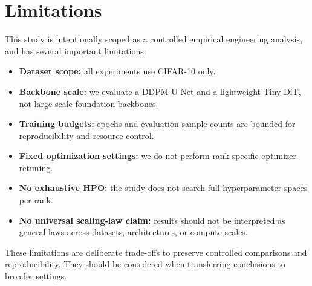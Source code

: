 \section{Limitations}

This study is intentionally scoped as a controlled empirical engineering analysis, and has several important limitations:
\begin{itemize}[leftmargin=1.5em]
  \item \textbf{Dataset scope:} all experiments use CIFAR-10 only.
  \item \textbf{Backbone scale:} we evaluate a DDPM U-Net and a lightweight Tiny DiT, not large-scale foundation backbones.
  \item \textbf{Training budgets:} epochs and evaluation sample counts are bounded for reproducibility and resource control.
  \item \textbf{Fixed optimization settings:} we do not perform rank-specific optimizer retuning.
  \item \textbf{No exhaustive HPO:} the study does not search full hyperparameter spaces per rank.
  \item \textbf{No universal scaling-law claim:} results should not be interpreted as general laws across datasets, architectures, or compute scales.
\end{itemize}

These limitations are deliberate trade-offs to preserve controlled comparisons and reproducibility. They should be considered when transferring conclusions to broader settings.
